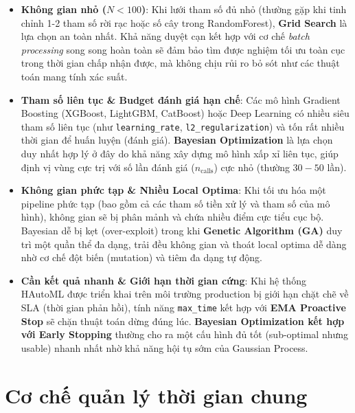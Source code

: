 \documentclass[12pt,a4paper]{article}
\begin{document}
\begin{itemize}[leftmargin=*]
    \item \textbf{Không gian nhỏ ($N < 100$)}: Khi lưới tham số đủ nhỏ (thường gặp khi tinh chỉnh 1-2 tham số rời rạc hoặc số cây trong RandomForest), \textbf{Grid Search} là lựa chọn an toàn nhất. Khả năng duyệt cạn kết hợp với cơ chế \textit{batch processing} song song hoàn toàn sẽ đảm bảo tìm được nghiệm tối ưu toàn cục trong thời gian chấp nhận được, mà không chịu rủi ro bỏ sót như các thuật toán mang tính xác suất.

    \item \textbf{Tham số liên tục \& Budget đánh giá hạn chế}: Các mô hình Gradient Boosting (XGBoost, LightGBM, CatBoost) hoặc Deep Learning có nhiều siêu tham số liên tục (như \texttt{learning\_rate}, \texttt{l2\_regularization}) và tốn rất nhiều thời gian để huấn luyện (đánh giá). \textbf{Bayesian Optimization} là lựa chọn duy nhất hợp lý ở đây do khả năng xây dựng mô hình xấp xỉ liên tục, giúp định vị vùng cực trị với số lần đánh giá ($n_{\text{calls}}$) cực nhỏ (thường $30-50$ lần).

    \item \textbf{Không gian phức tạp \& Nhiều Local Optima}: Khi tối ưu hóa một pipeline phức tạp (bao gồm cả các tham số tiền xử lý và tham số của mô hình), không gian sẽ bị phân mảnh và chứa nhiều điểm cực tiểu cục bộ. Bayesian dễ bị kẹt (over-exploit) trong khi \textbf{Genetic Algorithm (GA)} duy trì một quần thể đa dạng, trải đều không gian và thoát local optima dễ dàng nhờ cơ chế đột biến (mutation) và tiêm đa dạng tự động.

    \item \textbf{Cần kết quả nhanh \& Giới hạn thời gian cứng}: Khi hệ thống HAutoML được triển khai trên môi trường production bị giới hạn chặt chẽ về SLA (thời gian phản hồi), tính năng \texttt{max\_time} kết hợp với \textbf{EMA Proactive Stop} sẽ chặn thuật toán dừng đúng lúc. \textbf{Bayesian Optimization kết hợp với Early Stopping} thường cho ra một cấu hình đủ tốt (sub-optimal nhưng usable) nhanh nhất nhờ khả năng hội tụ sớm của Gaussian Process.
\end{itemize}

\section{Cơ chế quản lý thời gian chung}
\label{sec:time_management}
\end{document}
